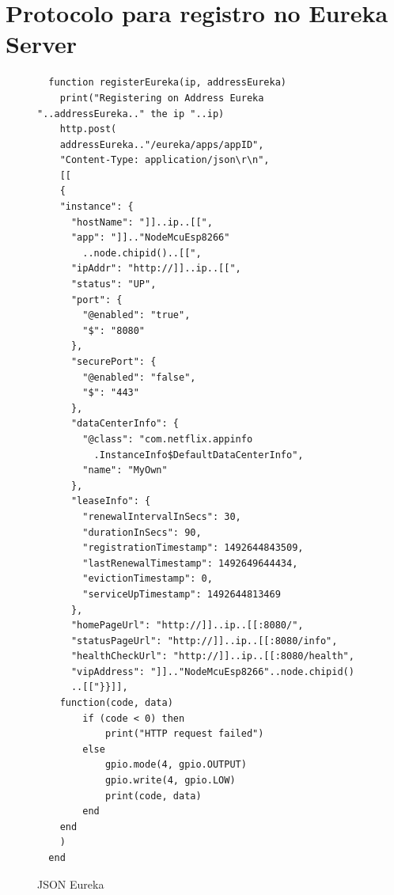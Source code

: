 \documentclass[journal]{IEEEtran}
\begin{document}
\section{Protocolo para registro no Eureka Server}
\begin{figure}[H]
\centering

\begin{lstlisting}
  function registerEureka(ip, addressEureka)
    print("Registering on Address Eureka "..addressEureka.." the ip "..ip)
    http.post(
    addressEureka.."/eureka/apps/appID",
    "Content-Type: application/json\r\n",
    [[
    {
    "instance": {
      "hostName": "]]..ip..[[",
      "app": "]].."NodeMcuEsp8266"
        ..node.chipid()..[[",
      "ipAddr": "http://]]..ip..[[",
      "status": "UP",
      "port": {
        "@enabled": "true",
        "$": "8080"
      },
      "securePort": {
        "@enabled": "false",
        "$": "443"
      },
      "dataCenterInfo": {
        "@class": "com.netflix.appinfo
          .InstanceInfo$DefaultDataCenterInfo",
        "name": "MyOwn"
      },
      "leaseInfo": {
        "renewalIntervalInSecs": 30,
        "durationInSecs": 90,
        "registrationTimestamp": 1492644843509,
        "lastRenewalTimestamp": 1492649644434,
        "evictionTimestamp": 0,
        "serviceUpTimestamp": 1492644813469
      },
      "homePageUrl": "http://]]..ip..[[:8080/",
      "statusPageUrl": "http://]]..ip..[[:8080/info",
      "healthCheckUrl": "http://]]..ip..[[:8080/health",
      "vipAddress": "]].."NodeMcuEsp8266"..node.chipid()
      ..[["}}]],
    function(code, data)
        if (code < 0) then
            print("HTTP request failed")
        else
            gpio.mode(4, gpio.OUTPUT)
            gpio.write(4, gpio.LOW)
            print(code, data)
        end
    end
    )
  end

\end{lstlisting}
\caption{JSON Eureka}
\label{protocolojsoneureka}
\end{figure}
\end{document}
